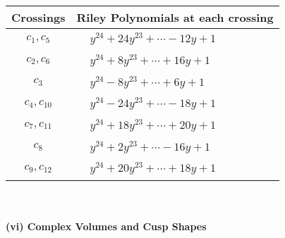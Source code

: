 \documentclass[1p]{elsarticle_modified}
\theoremstyle{definition}
\begin{document}
\begin{tabular}{m{50pt}|m{274pt}}
Crossings & \hspace{64pt}Riley Polynomials at each crossing \\
\hline $$\begin{aligned}c_{1},c_{5}\end{aligned}$$&$\begin{aligned}
&y^{24}+24 y^{23}+\cdots-12 y+1
\end{aligned}$\\
\hline $$\begin{aligned}c_{2},c_{6}\end{aligned}$$&$\begin{aligned}
&y^{24}+8 y^{23}+\cdots+16 y+1
\end{aligned}$\\
\hline $$\begin{aligned}c_{3}\end{aligned}$$&$\begin{aligned}
&y^{24}-8 y^{23}+\cdots+6 y+1
\end{aligned}$\\
\hline $$\begin{aligned}c_{4},c_{10}\end{aligned}$$&$\begin{aligned}
&y^{24}-24 y^{23}+\cdots-18 y+1
\end{aligned}$\\
\hline $$\begin{aligned}c_{7},c_{11}\end{aligned}$$&$\begin{aligned}
&y^{24}+18 y^{23}+\cdots+20 y+1
\end{aligned}$\\
\hline $$\begin{aligned}c_{8}\end{aligned}$$&$\begin{aligned}
&y^{24}+2 y^{23}+\cdots-16 y+1
\end{aligned}$\\
\hline $$\begin{aligned}c_{9},c_{12}\end{aligned}$$&$\begin{aligned}
&y^{24}+20 y^{23}+\cdots+18 y+1
\end{aligned}$\\
\hline
\end{tabular}\\~\\
\newpage\flushleft \textbf{(vi) Complex Volumes and Cusp Shapes}
\end{document}
